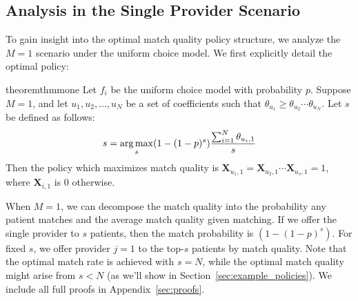 \subsection{Analysis in the Single Provider Scenario}
\label{sec:greedy_provider}
To gain insight into the optimal match quality policy structure, we analyze the $M=1$ scenario under the uniform choice model. 
We first explicitly detail the optimal policy: 
\begin{restatable}{theorem}{thmmone}
\label{thm:one_m}
    Let $f_{i}$ be the uniform choice model with probability $p$.
    Suppose $M=1$, and let $u_{1},u_{2},\ldots,u_{N}$ be a set of coefficients such that $\theta_{u_{1}} \geq \theta_{u_{2}} \cdots \theta_{u_{N}}$.
    Let $s$ be defined as follows:
    \begin{equation}
       s = \operatorname*{arg\,max}_{s} (1-(1-p)^{s}) \frac{\sum_{i=1}^{N} \theta_{u_{i},1}}{s}
    \end{equation}
    Then the policy which maximizes match quality is $\mathbf{X}_{u_{1},1} = \mathbf{X}_{u_{2},1} \cdots \mathbf{X}_{u_{s},1} = 1$, where $\mathbf{X}_{i,1}$ is 0 otherwise. 
\end{restatable}
When $M=1$, we can decompose the match quality into the probability any patient matches and the average match quality given matching. 
If we offer the single provider to $s$ patients, then the match probability is $ (1-(1-p)^{s})$.
For fixed $s$, we offer provider $j=1$ to the top-$s$ patients by match quality. 
Note that the optimal match rate is achieved with $s=N$, while the optimal match quality might arise from $s < N$ (as we'll show in Section~\ref{sec:example_policies}). 
We include all full proofs in Appendix~\ref{sec:proofs}. 
